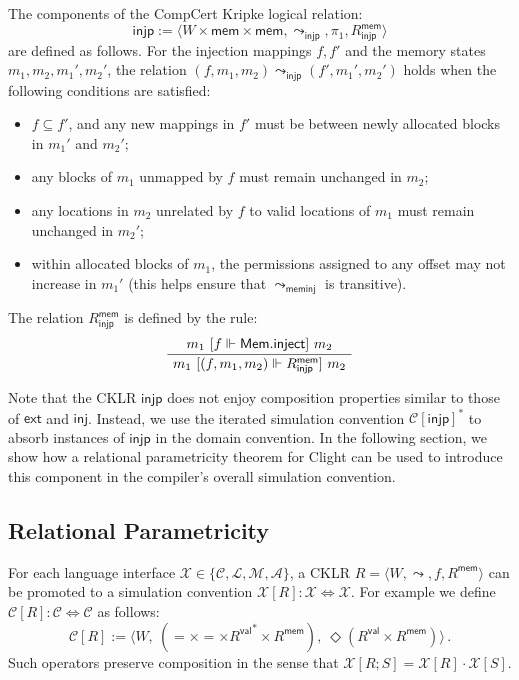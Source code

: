 \documentclass[acmsmall,timestamp,review,anonymous]{acmart}
\newcommand{\kw}[1]{\ensuremath{ \mathsf{#1} }}
\newcommand{\ifr}[1]{\ [{#1}]\ }
\begin{document}
\begin{definition}
The components of the CompCert Kripke logical relation:
\[ \kw{injp} :=
  \langle
    W \times \kw{mem} \times \kw{mem},
    \leadsto_\kw{injp}, \pi_1, R_\kw{injp}^\kw{mem}
  \rangle \]
are defined as follows.
For the injection mappings $f, f'$ and
the memory states $m_1, m_2, m_1', m_2'$,
the relation $(f, m_1, m_2) \leadsto_\kw{injp} (f', m_1', m_2')$
holds when the following conditions are satisfied:
\begin{itemize}
\item $f \subseteq f'$, and any new mappings in $f'$
  must be between newly allocated blocks in $m_1'$ and $m_2'$;
\item any blocks of $m_1$ unmapped by $f$
  must remain unchanged in $m_2$;
\item any locations in $m_2$ unrelated by $f$
  to valid locations of $m_1$ must remain unchanged in $m_2'$;
\item within allocated blocks of $m_1$,
  the permissions assigned to any offset may not increase in $m_1'$
  (this helps ensure that $\leadsto_\kw{meminj}$ is transitive).
\end{itemize}
The relation $R_\kw{injp}^\kw{mem}$ is defined by the rule:
\[
  \AxiomC{$m_1 \ifr{f \Vdash \kw{Mem.inject}} m_2$}
  \UnaryInfC{$m_1 \ifr{(f, m_1, m_2) \Vdash R_\kw{injp}^\kw{mem}} m_2$}
  \DisplayProof
\]
\end{definition}

Note that the CKLR $\kw{injp}$
does not enjoy composition properties
similar to those of $\kw{ext}$ and $\kw{inj}$.
Instead,
we use the iterated simulation convention $\mathcal{C}[\kw{injp}]^*$
to absorb instances of $\kw{injp}$ in the domain convention.
In the following section,
we show how a relational parametricity theorem for
Clight can be used to introduce this component
in the compiler's overall simulation convention.


\subsection{Relational Parametricity} \label{sec:compcert:param} %

For each language interface
$\mathcal{X} \in \{ \mathcal{C}, \mathcal{L}, \mathcal{M}, \mathcal{A} \}$,
a CKLR
$R = \langle W, {\leadsto}, f, R^\kw{mem} \rangle$ can be promoted to
a simulation convention
$\mathcal{X}[R] : \mathcal{X} \Leftrightarrow \mathcal{X}$.
For example
we define $\mathcal{C}[R] : \mathcal{C} \Leftrightarrow \mathcal{C}$
as follows:
\[
    \mathcal{C}[R] := \langle
      W, \:
      ({=} \times {=} \times {R^\kw{val}}^* \times R^\kw{mem}), \:
      \Diamond (R^\kw{val} \times R^\kw{mem})
    \rangle \,.
\]
Such operators preserve composition
in the sense that $\mathcal{X}[R ; S] = \mathcal{X}[R] \cdot \mathcal{X}[S]$.
\end{document}
